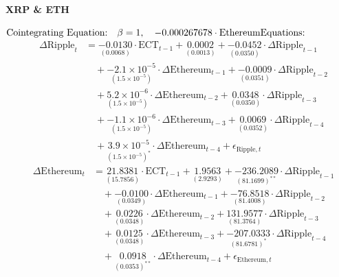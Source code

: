 %
\begin{center}
    \textbf{XRP \& ETH}
\end{center}
$\text{Cointegrating Equation:} \quad  \beta = 1, \quad -0.000267678 \cdot \text{Ethereum} \\
\text{Equations:} $
\begin{align*}
 \quad
\Delta \text{Ripple}_t &= 
\underset{(0.0068)}{-0.0130} \cdot \text{ECT}_{t-1} + 
\underset{(0.0013)}{0.0002} + 
\underset{(0.0350)}{-0.0452} \cdot \Delta \text{Ripple}_{t-1} \\
&\quad + \underset{(1.5 \times 10^{-5})}{-2.1 \times 10^{-5}} \cdot \Delta \text{Ethereum}_{t-1} + 
\underset{(0.0351)}{-0.0009} \cdot \Delta \text{Ripple}_{t-2} \\
&\quad + \underset{(1.5 \times 10^{-5})}{5.2 \times 10^{-6}} \cdot \Delta \text{Ethereum}_{t-2} + 
\underset{(0.0350)}{0.0348} \cdot \Delta \text{Ripple}_{t-3} \\
&\quad + \underset{(1.5 \times 10^{-5})}{-1.1 \times 10^{-6}} \cdot \Delta \text{Ethereum}_{t-3} + 
\underset{(0.0352)}{0.0069} \cdot \Delta \text{Ripple}_{t-4} \\
&\quad + \underset{(1.5 \times 10^{-5})^{*}}{3.9 \times 10^{-5}} \cdot \Delta \text{Ethereum}_{t-4} + \epsilon_{\text{Ripple},t}
\end{align*}
\begin{align*}
\quad
\Delta \text{Ethereum}_t &= 
\underset{(15.7856)}{21.8381} \cdot \text{ECT}_{t-1} + 
\underset{(2.9293)}{1.9563} + 
\underset{(81.1699)^{**}}{-236.2089} \cdot \Delta \text{Ripple}_{t-1} \\
&\quad + \underset{(0.0349)}{-0.0100} \cdot \Delta \text{Ethereum}_{t-1} + 
\underset{(81.4008)}{-76.8518} \cdot \Delta \text{Ripple}_{t-2} \\
&\quad + \underset{(0.0348)}{0.0226} \cdot \Delta \text{Ethereum}_{t-2} + 
\underset{(81.3764)}{131.9577} \cdot \Delta \text{Ripple}_{t-3} \\
&\quad + \underset{(0.0348)}{0.0125} \cdot \Delta \text{Ethereum}_{t-3} + 
\underset{(81.6781)^{*}}{-207.0333} \cdot \Delta \text{Ripple}_{t-4} \\
&\quad + \underset{(0.0353)^{**}}{0.0918} \cdot \Delta \text{Ethereum}_{t-4} + \epsilon_{\text{Ethereum},t}
\end{align*}


